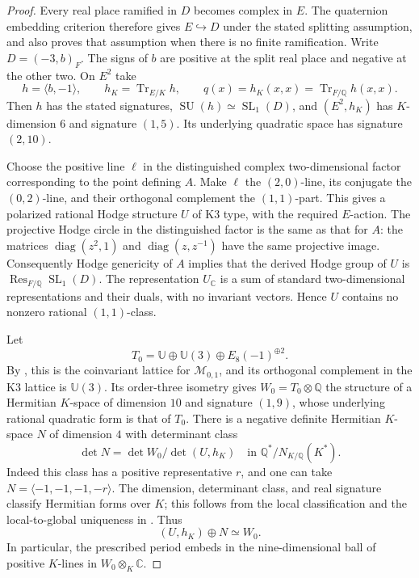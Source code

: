 \documentclass[11pt]{article}
\theoremstyle{definition}
\theoremstyle{remark}
\begin{document}
\begin{proof}
Every real place ramified in $D$ becomes complex in $E$.
The quaternion embedding criterion
\cite[Proposition~14.6.7]{clifford-Voight} therefore gives $E\hookrightarrow D$
under the stated splitting assumption, and also proves that assumption
when there is no finite ramification.
Write $D=(-3,b)_F$.
The signs of $b$ are positive at the split real place and negative at
the other two.  On $E^2$ take
\[
 h=\langle b,-1\rangle,\qquad
 h_K=\operatorname{Tr}_{E/K}h,\qquad
 q(x)=h_K(x,x)=\operatorname{Tr}_{F/\mathbb Q}h(x,x).
\]
Then $h$ has the stated signatures,
$\operatorname{SU}(h)\simeq\operatorname{SL}_1(D)$,
and $(E^2,h_K)$ has $K$-dimension $6$ and signature $(1,5)$.
Its underlying quadratic space has signature $(2,10)$.

Choose the positive line $\ell$ in the distinguished complex
two-dimensional factor corresponding to the point defining $A$.
Make $\ell$ the $(2,0)$-line, its conjugate the $(0,2)$-line, and
their orthogonal complement the $(1,1)$-part.
This gives a polarized rational Hodge structure $U$ of K3 type,
with the required $E$-action.
The projective Hodge circle in the distinguished factor is the same
as that for $A$: the matrices
$\operatorname{diag}(z^2,1)$ and $\operatorname{diag}(z,z^{-1})$
have the same projective image.
Consequently Hodge genericity of $A$ implies that the derived Hodge
group of $U$ is $\operatorname{Res}_{F/\mathbb Q}\operatorname{SL}_1(D)$.
The representation $U_{\mathbb C}$ is a sum of standard
two-dimensional representations and their duals, with no invariant
vectors.  Hence $U$ contains no nonzero rational $(1,1)$-class.

Let
\[
 T_0=\mathbb U\oplus\mathbb U(3)\oplus E_8(-1)^{\oplus2}.
\]
By \cite[Table~2 and Proposition~3.2]{clifford-AS}, this is the
coinvariant lattice for $\mathcal M_{0,1}$, and its orthogonal
complement in the K3 lattice is $\mathbb U(3)$.
Its order-three isometry gives $W_0=T_0\otimes\mathbb Q$ the
structure of a Hermitian $K$-space of dimension $10$ and signature
$(1,9)$, whose underlying rational quadratic form is that of $T_0$.
There is a negative definite Hermitian $K$-space $N$ of dimension
$4$ with determinant class
\[
 \det N=\det W_0/\det(U,h_K)
       \quad\text{in }\mathbb Q^*/N_{K/\mathbb Q}(K^*).
\]
Indeed this class has a positive representative $r$, and one can
take $N=\langle-1,-1,-1,-r\rangle$.
The dimension, determinant class, and real signature classify
Hermitian forms over $K$; this follows from the local classification
and the local-to-global uniqueness in
\cite[\S3, Theorem~3.1]{clifford-Gross}.
Thus
\[
             (U,h_K)\oplus N\simeq W_0.
\]
In particular, the prescribed period embeds in the nine-dimensional
ball of positive $K$-lines in $W_0\otimes_{K}\mathbb C$.


\end{proof}
\end{document}
